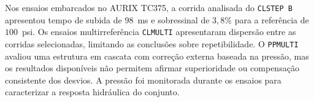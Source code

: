 Nos ensaios embarcados no AURIX TC375, a corrida analisada do \texttt{CLSTEP B} apresentou tempo de subida de $98$~ms e sobressinal de $3{,}8\%$ para a referência de $100$~psi. Os ensaios multirreferência \texttt{CLMULTI} apresentaram dispersão entre as corridas selecionadas, limitando as conclusões sobre repetibilidade. O \texttt{PPMULTI} avaliou uma estrutura em cascata com correção externa baseada na pressão, mas os resultados disponíveis não permitem afirmar superioridade ou compensação consistente dos desvios. A pressão foi monitorada durante os ensaios para caracterizar a resposta hidráulica do conjunto.














